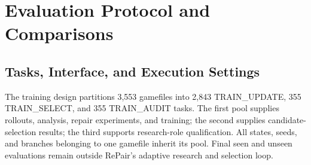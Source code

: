 \section{Evaluation Protocol and Comparisons}
\label{app:experimental}
\subsection{Tasks, Interface, and Execution Settings}
\label{app:configuration}
The training design partitions 3,553 gamefiles into 2,843 TRAIN\_UPDATE,
355 TRAIN\_SELECT, and 355 TRAIN\_AUDIT tasks. The first pool supplies
rollouts, analysis, repair experiments, and training; the second supplies
candidate-selection results; the third supports research-role qualification.
All states, seeds, and branches belonging to one gamefile inherit its pool.
Final seen and unseen evaluations remain outside RePair's adaptive research
and selection loop.


